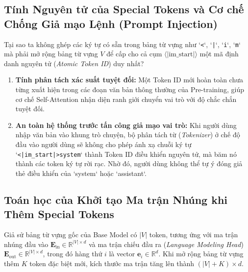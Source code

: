 \subsection{Tính Nguyên tử của Special Tokens và Cơ chế Chống Giả mạo Lệnh (Prompt Injection)}
Tại sao ta không ghép các ký tự có sẵn trong bảng từ vựng như `\texttt{<}`, `\texttt{|}`, `\texttt{i}`, `\texttt{m}` mà phải mở rộng bảng từ vựng $V$ để cấp cho cả cụm $\langle|\text{im\_start}|\rangle$ một mã định danh nguyên tử (\textit{Atomic Token ID}) duy nhất?
\begin{enumerate}[leftmargin=1.2cm]
    \item \textbf{Tính phân tách xác suất tuyệt đối:} Một Token ID mới hoàn toàn chưa từng xuất hiện trong các đoạn văn bản thông thường của Pre-training, giúp cơ chế Self-Attention nhận diện ranh giới chuyển vai trò với độ chắc chắn tuyệt đối.
    \item \textbf{An toàn hệ thống trước tấn công giả mạo vai trò:} Khi người dùng nhập văn bản vào khung trò chuyện, bộ phân tách từ (\textit{Tokenizer}) ở chế độ đầu vào người dùng sẽ không cho phép ánh xạ chuỗi ký tự `\texttt{<|im\_start|>system}` thành Token ID điều khiển nguyên tử, mà băm nó thành các token ký tự rời rạc. Nhờ đó, người dùng không thể tự ý đóng giả thẻ điều khiển của `system` hoặc `assistant`.
\end{enumerate}

\subsection{Toán học của Khởi tạo Ma trận Nhúng khi Thêm Special Tokens \citep{hewitt2021initializing}}
Giả sử bảng từ vựng gốc của Base Model có $|V|$ token, tương ứng với ma trận nhúng đầu vào $\mathbf{E}_{\text{in}} \in \mathbb{R}^{|V| \times d}$ và ma trận chiếu đầu ra (\textit{Language Modeling Head}) $\mathbf{E}_{\text{out}} \in \mathbb{R}^{|V| \times d}$, trong đó hàng thứ $i$ là vector $\mathbf{e}_i \in \mathbb{R}^d$. Khi mở rộng bảng từ vựng thêm $K$ token đặc biệt mới, kích thước ma trận tăng lên thành $(|V| + K) \times d$.

